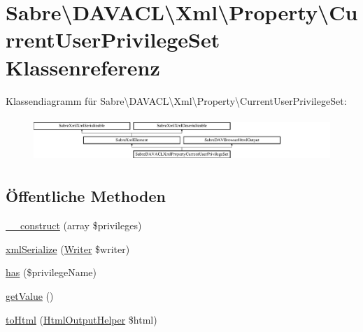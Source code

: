 \hypertarget{class_sabre_1_1_d_a_v_a_c_l_1_1_xml_1_1_property_1_1_current_user_privilege_set}{}\section{Sabre\textbackslash{}D\+A\+V\+A\+CL\textbackslash{}Xml\textbackslash{}Property\textbackslash{}Current\+User\+Privilege\+Set Klassenreferenz}
\label{class_sabre_1_1_d_a_v_a_c_l_1_1_xml_1_1_property_1_1_current_user_privilege_set}
Klassendiagramm für Sabre\textbackslash{}D\+A\+V\+A\+CL\textbackslash{}Xml\textbackslash{}Property\textbackslash{}Current\+User\+Privilege\+Set\+:\begin{figure}[H]
\begin{center}
\leavevmode
\includegraphics[height=1.702128cm]{class_sabre_1_1_d_a_v_a_c_l_1_1_xml_1_1_property_1_1_current_user_privilege_set}
\end{center}
\end{figure}
\subsection*{Öffentliche Methoden}
\begin{DoxyCompactItemize}
\item 
\mbox{\hyperlink{class_sabre_1_1_d_a_v_a_c_l_1_1_xml_1_1_property_1_1_current_user_privilege_set_a05a7d8d5105854e9b9845842eae1ddba}{\+\_\+\+\_\+construct}} (array \$privileges)
\item 
\mbox{\hyperlink{class_sabre_1_1_d_a_v_a_c_l_1_1_xml_1_1_property_1_1_current_user_privilege_set_a1a60129813a1acc5aebfb260306df9b5}{xml\+Serialize}} (\mbox{\hyperlink{class_sabre_1_1_xml_1_1_writer}{Writer}} \$writer)
\item 
\mbox{\hyperlink{class_sabre_1_1_d_a_v_a_c_l_1_1_xml_1_1_property_1_1_current_user_privilege_set_ad9ceb9e25e5407ae90a136138d94ec87}{has}} (\$privilege\+Name)
\item 
\mbox{\hyperlink{class_sabre_1_1_d_a_v_a_c_l_1_1_xml_1_1_property_1_1_current_user_privilege_set_a28399e4d5a99201259b81c0eaf4d5b7b}{get\+Value}} ()
\item 
\mbox{\hyperlink{class_sabre_1_1_d_a_v_a_c_l_1_1_xml_1_1_property_1_1_current_user_privilege_set_ab15d2dbb957c67a5a58b5d93f4a47bfd}{to\+Html}} (\mbox{\hyperlink{class_sabre_1_1_d_a_v_1_1_browser_1_1_html_output_helper}{Html\+Output\+Helper}} \$html)
\end{DoxyCompactItemize}
